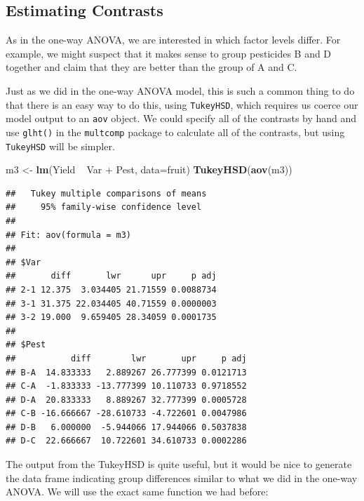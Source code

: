 \documentclass[]{book}
\newenvironment{Shaded}{\begin{snugshade}}{\end{snugshade}}
\newcommand{\KeywordTok}[1]{\textcolor[rgb]{0.13,0.29,0.53}{\textbf{{#1}}}}
\newcommand{\DataTypeTok}[1]{\textcolor[rgb]{0.13,0.29,0.53}{{#1}}}
\newcommand{\StringTok}[1]{\textcolor[rgb]{0.31,0.60,0.02}{{#1}}}
\newcommand{\NormalTok}[1]{{#1}}
\theoremstyle{definition}
\theoremstyle{definition}
\theoremstyle{remark}
\begin{document}
\subsection{Estimating Contrasts}\label{estimating-contrasts}

As in the one-way ANOVA, we are interested in which factor levels
differ. For example, we might suspect that it makes sense to group
pesticides B and D together and claim that they are better than the
group of A and C.

Just as we did in the one-way ANOVA model, this is such a common thing
to do that there is an easy way to do this, using \texttt{TukeyHSD},
which requires us coerce our model output to an \texttt{aov} object. We
could specify all of the contrasts by hand and use \texttt{glht()} in
the \texttt{multcomp} package to calculate all of the contrasts, but
using \texttt{TukeyHSD} will be simpler.

\begin{Shaded}
\begin{Highlighting}[]
\NormalTok{m3 <-}\StringTok{ }\KeywordTok{lm}\NormalTok{(Yield ~}\StringTok{ }\NormalTok{Var +}\StringTok{ }\NormalTok{Pest, }\DataTypeTok{data=}\NormalTok{fruit)}
\KeywordTok{TukeyHSD}\NormalTok{(}\KeywordTok{aov}\NormalTok{(m3))}
\end{Highlighting}
\end{Shaded}

\begin{verbatim}
##   Tukey multiple comparisons of means
##     95% family-wise confidence level
## 
## Fit: aov(formula = m3)
## 
## $Var
##       diff       lwr      upr     p adj
## 2-1 12.375  3.034405 21.71559 0.0088734
## 3-1 31.375 22.034405 40.71559 0.0000003
## 3-2 19.000  9.659405 28.34059 0.0001735
## 
## $Pest
##           diff        lwr       upr     p adj
## B-A  14.833333   2.889267 26.777399 0.0121713
## C-A  -1.833333 -13.777399 10.110733 0.9718552
## D-A  20.833333   8.889267 32.777399 0.0005728
## C-B -16.666667 -28.610733 -4.722601 0.0047986
## D-B   6.000000  -5.944066 17.944066 0.5037838
## D-C  22.666667  10.722601 34.610733 0.0002286
\end{verbatim}

The output from the TukeyHSD is quite useful, but it would be nice to
generate the data frame indicating group differences similar to what we
did in the one-way ANOVA. We will use the exact same function we had
before:
\end{document}

